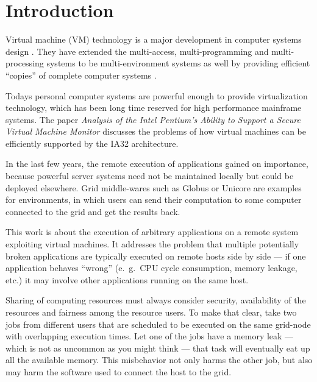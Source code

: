 
\chapter{Introduction}
\label{cha:intro}

Virtual machine (VM) technology is a major development in computer systems
design   \cite{buzen73}.     They   have   extended    the   multi-access,
multi-programming  and multi-processing  systems  to be  multi-environment
systems  as well by  providing efficient  ``copies'' of  complete computer
systems \cite{goldberg73}.

Todays  personal   computer  systems   are  powerful  enough   to  provide
virtualization  technology, which  has been  long time  reserved  for high
performance  mainframe  systems. The  paper  \emph{Analysis  of the  Intel
  Pentium's    Ability    to   Support    a    Secure   Virtual    Machine
  Monitor}\cite{robin00analysis}  discusses the  problems  of how  virtual
machines can be efficiently supported by the IA32 architecture.

In  the last few  years, the  remote execution  of applications  gained on
importance, because powerful server systems need not be maintained locally
but  could be  deployed elsewhere.  Grid  middle-wares such  as Globus  or
Unicore  are examples  for environments,  in  which users  can send  their
computation to  some computer  connected to the  grid and get  the results
back.

This work  is about  the execution of  arbitrary applications on  a remote
system exploiting virtual machines. It addresses the problem that multiple
potentially  broken applications  are typically  executed on  remote hosts
side by  side ---  if one application  behaves ``wrong''  (e.~g.~CPU cycle
consumption,  memory  leakage, etc.)  it  may  involve other  applications
running on the same host.

Sharing of computing resources must always consider security, availability
of  the resources and  fairness among  the resource  users.  To  make that
clear,  take  two jobs  from  different users  that  are  scheduled to  be
executed on the  same grid-node with overlapping execution  times. Let one
of the jobs have  a memory leak --- which is not  as uncommon as you might
think --- that task will eventually  eat up all the available memory. This
misbehavior not only  harms the other job, but also  may harm the software
used to connect the host to the grid.

